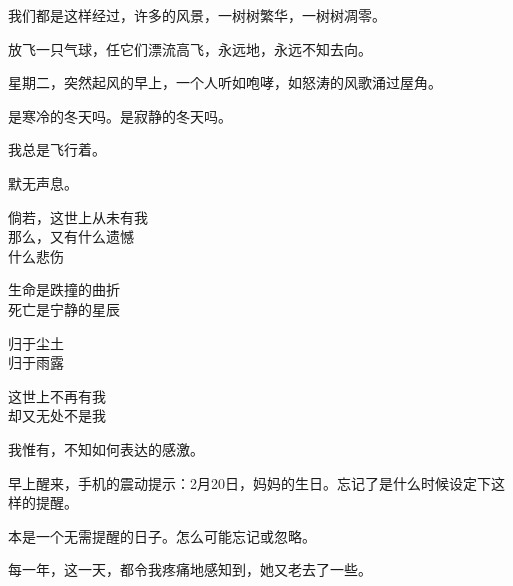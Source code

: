 		\vspace{1em}
		我们都是这样经过，许多的风景，一树树繁华，一树树凋零。\par
		放飞一只气球，任它们漂流高飞，永远地，永远不知去向。

		\vspace{1em}
		星期二，突然起风的早上，一个人听如咆哮，如怒涛的风歌涌过屋角。\par
		是寒冷的冬天吗。是寂静的冬天吗。\par
		我总是飞行着。\par
		默无声息。

	\endwriting



		\longpoem{}{}{}

			倘若，这世上从未有我 \\
			那么，又有什么遗憾 \\
			什么悲伤

			生命是跌撞的曲折 \\
			死亡是宁静的星辰

			归于尘土 \\
			归于雨露

			这世上不再有我 \\
			却又无处不是我
		\endlongpoem

	\endwriting



		我惟有，不知如何表达的感激。


		\vspace{1em}
		早上醒来，手机的震动提示：2月20日，妈妈的生日。忘记了是什么时候设定下这样的提醒。\par
		本是一个无需提醒的日子。怎么可能忘记或忽略。\par
		每一年，这一天，都令我疼痛地感知到，她又老去了一些。

